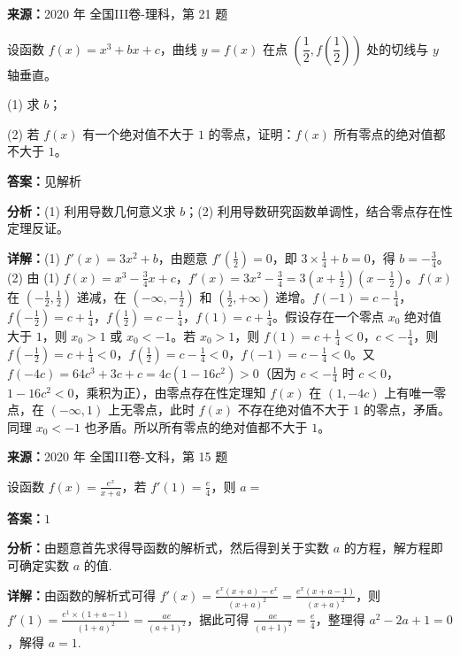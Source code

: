 \begin{question}[points=12]
\textbf{来源：}2020 年 全国III卷-理科，第 21 题\par
设函数 $f(x)=x^3+bx+c$，曲线 $y=f(x)$ 在点 $\left(\dfrac12,f\left(\dfrac12\right)\right)$ 处的切线与 $y$ 轴垂直。

(1) 求 $b$；

(2) 若 $f(x)$ 有一个绝对值不大于 $1$ 的零点，证明：$f(x)$ 所有零点的绝对值都不大于 $1$。
\begin{solution}
\textbf{答案：}见解析

\textbf{分析：}(1) 利用导数几何意义求 $b$；(2) 利用导数研究函数单调性，结合零点存在性定理反证。

\textbf{详解：}(1) $f'(x)=3x^2+b$，由题意 $f'\left(\frac12\right)=0$，即 $3\times\frac14+b=0$，得 $b=-\frac34$。
(2) 由 (1) $f(x)=x^3-\frac34x+c$，$f'(x)=3x^2-\frac34=3\left(x+\frac12\right)\left(x-\frac12\right)$。$f(x)$ 在 $\left(-\frac12,\frac12\right)$ 递减，在 $\left(-\infty,-\frac12\right)$ 和 $\left(\frac12,+\infty\right)$ 递增。$f(-1)=c-\frac14$，$f\left(-\frac12\right)=c+\frac14$，$f\left(\frac12\right)=c-\frac14$，$f(1)=c+\frac14$。假设存在一个零点 $x_0$ 绝对值大于 $1$，则 $x_0>1$ 或 $x_0<-1$。若 $x_0>1$，则 $f(1)=c+\frac14<0$，$c<-\frac14$，则 $f\left(-\frac12\right)=c+\frac14<0$，$f\left(\frac12\right)=c-\frac14<0$，$f(-1)=c-\frac14<0$。又 $f(-4c)=64c^3+3c+c=4c(1-16c^2)>0$（因为 $c<-\frac14$ 时 $c<0$，$1-16c^2<0$，乘积为正），由零点存在性定理知 $f(x)$ 在 $(1,-4c)$ 上有唯一零点，在 $(-\infty,1)$ 上无零点，此时 $f(x)$ 不存在绝对值不大于 $1$ 的零点，矛盾。同理 $x_0<-1$ 也矛盾。所以所有零点的绝对值都不大于 $1$。
\end{solution}
\end{question}

\begin{question}[points=5]
\textbf{来源：}2020 年 全国III卷-文科，第 15 题\par
设函数 $f(x)=\frac{e^x}{x+a}$，若 $f'(1)=\frac{e}{4}$，则 $a=$
\fillin[{$1$}]
\begin{solution}
\textbf{答案：}$1$

\textbf{分析：}由题意首先求得导函数的解析式，然后得到关于实数 $a$ 的方程，解方程即可确定实数 $a$ 的值.

\textbf{详解：}由函数的解析式可得 $f'(x)=\frac{e^x(x+a)-e^x}{(x+a)^2}=\frac{e^x(x+a-1)}{(x+a)^2}$，则 $f'(1)=\frac{e^1\times(1+a-1)}{(1+a)^2}=\frac{ae}{(a+1)^2}$，据此可得 $\frac{ae}{(a+1)^2}=\frac{e}{4}$，整理得 $a^2-2a+1=0$，解得 $a=1$.
\end{solution}
\end{question}

